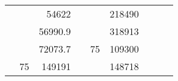 \begin{table}[H]
\begin{tabular}{|ccrccrccc}
\multicolumn{1}{|c|}{\cellcolor[HTML]{FFFFC7}}                                & \multicolumn{1}{c|}{\cellcolor[HTML]{DAE8FC}}                      & \multicolumn{1}{r|}{\cellcolor[HTML]{DAE8FC}54622}     & \multicolumn{1}{c|}{\cellcolor[HTML]{FFFFC7}}                                & \multicolumn{1}{c|}{\cellcolor[HTML]{DAE8FC}}                       & \multicolumn{1}{r|}{\cellcolor[HTML]{DDFDFF}218490}    &                                                                              &                                                                    &                                                        \\ \cline{3-3} \cline{6-6}
\multicolumn{1}{|c|}{\cellcolor[HTML]{FFFFC7}}                                & \multicolumn{1}{c|}{\cellcolor[HTML]{DAE8FC}}                      & \multicolumn{1}{r|}{\cellcolor[HTML]{DDFDFF}56990.9}   & \multicolumn{1}{c|}{\cellcolor[HTML]{FFFFC7}}                                & \multicolumn{1}{c|}{\cellcolor[HTML]{DAE8FC}}                       & \multicolumn{1}{r|}{\cellcolor[HTML]{DAE8FC}318913}    &                                                                              &                                                                    &                                                        \\ \cline{3-3} \cline{6-6}
\multicolumn{1}{|c|}{\cellcolor[HTML]{FFFFC7}}                                & \multicolumn{1}{c|}{\cellcolor[HTML]{DAE8FC}}                      & \multicolumn{1}{r|}{\cellcolor[HTML]{DAE8FC}72073.7}   & \multicolumn{1}{c|}{\cellcolor[HTML]{FFFFC7}}                                & \multicolumn{1}{c|}{\multirow{-10}{*}{\cellcolor[HTML]{DAE8FC}75}}  & \multicolumn{1}{r|}{\cellcolor[HTML]{DDFDFF}109300}    &                                                                              &                                                                    &                                                        \\ \cline{3-3} \cline{5-6}
\multicolumn{1}{|c|}{\cellcolor[HTML]{FFFFC7}}                                & \multicolumn{1}{c|}{\multirow{-10}{*}{\cellcolor[HTML]{DAE8FC}75}} & \multicolumn{1}{r|}{\cellcolor[HTML]{DDFDFF}149191}    & \multicolumn{1}{c|}{\cellcolor[HTML]{FFFFC7}}                                & \multicolumn{1}{c|}{\cellcolor[HTML]{DDFDFF}}                       & \multicolumn{1}{r|}{\cellcolor[HTML]{DAE8FC}148718}    &                                                                              &                                                                    &                                                        \\ \cline{2-3} \cline{6-6}

\end{tabular}
\end{table}
